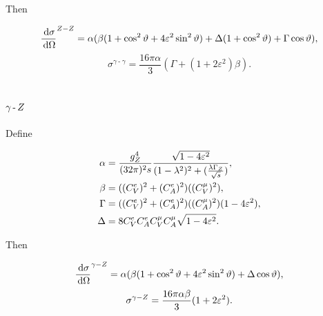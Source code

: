 \documentclass[]{article}
\begin{document}
Then

$$
\frac{\,\operatorname{d}\!{\sigma}}{\,\operatorname{d}\!{\Omega}}^{Z -Z }
  = \alpha(\beta(1+\cos^{2}{\vartheta}+4\varepsilon^{2}\sin^{2}{\vartheta})
    + \Delta(1+\cos^{2}{\vartheta})
    + \Gamma\cos{\vartheta}
  ),
$$
\begin{equation}
\sigma^{\gamma\operatorname{-}\gamma} = \frac{16\pi\alpha}{3}(\Gamma + (1 + 2\varepsilon^{2})\beta).
\end{equation}

\subsection{$\gamma\operatorname{-}Z $}

Define

\begin{align*}
\alpha &= \frac{g_{\Zzero}^{4}}{(32\pi)^{2}s} \frac{\sqrt{1-4\varepsilon^{2}}}{(1-\lambda^{2})^{2} + (\frac{\lambda\GZ}{\rts})},
\\
\beta &= ((C_{V}^{e})^{2} + (C_{A}^{e})^{2})((C_{V}^{\mu})^{2}),
\\
\Gamma &= ((C_{V}^{e})^{2} + (C_{A}^{e})^{2})((C_{A}^{\mu})^{2})(1-4\varepsilon^{2}),
\\
\Delta &= 8C_{V}^{e}C_{A}^{e}C_{V}^{\mu}C_{A}^{\mu}\sqrt{1-4\varepsilon^{2}}.
\end{align*}

Then

$$
\frac{\,\operatorname{d}\!{\sigma}}{\,\operatorname{d}\!{\Omega}}^{\gamma-Z }
  = \alpha(\beta(1+\cos^{2}{\vartheta}+4\varepsilon^{2}\sin^{2}{\vartheta})
    + \Delta\cos{\vartheta}
  ),
$$
\begin{equation}
\sigma^{\gamma-\Zzero} = \frac{16\pi\alpha\beta}{3}(1 + 2\varepsilon^{2}).
\end{equation}

\begin{thebibliography}{9}
\end{thebibliography}
\end{document}
